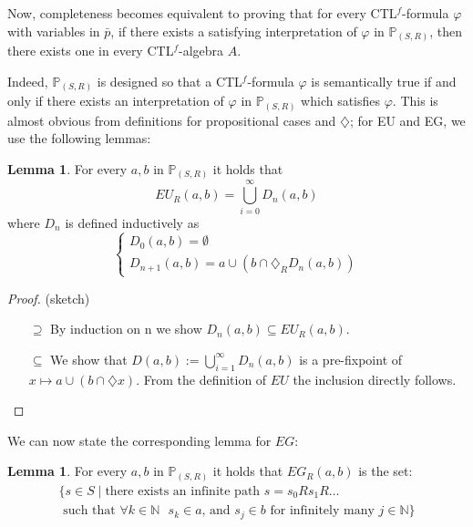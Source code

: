 \documentclass[11pt]{article}
\newcommand{\CTLf}{{CTL$^f$}}
\newcommand{\phii}{{\varphi}}
\newcommand{\dia}{{\diamondsuit}}
\theoremstyle{definition}
\newtheorem{lemma}[definition]{Lemma}
\begin{document}
Now, completeness becomes equivalent to proving that for every \CTLf-formula $\phii$ with variables in $\bar{p}$, 
if there exists a satisfying interpretation of $\phii$ in $\mathbb{P}_{(S,R)}$, then there exists one in every \CTLf-algebra $A$.

Indeed, $\mathbb{P}_{(S,R)}$ is designed so that 
a \CTLf-formula $\phii$ is semantically true if and only if there exists an interpretation of $\phii$ in $\mathbb{P}_{(S,R)}$ which satisfies $\phii$.
This is almost obvious from definitions for propositional cases and $\dia$; for EU and EG, we use the following lemmas:

\begin{lemma}\label{EU_as_union}
        For every $a,b$ in $\mathbb{P}_{(S,R)}$ it holds that \[EU_R(a,b)=\bigcup_{i=0}^{\infty}D_n(a,b)\] where $D_n$ is defined inductively as
        \begin{equation*}
            \begin{cases}
                D_0(a,b)=\emptyset\\
                D_{n+1}(a,b)=a\cup(b\cap\dia_R D_n(a,b))
            \end{cases}
        \end{equation*}
        
\end{lemma}

\begin{proof}(sketch)
    \begin{itemize}
        \item[$\supseteq$] By induction on n we show $D_n(a,b) \subseteq EU_R(a,b)$.
        \item[$\subseteq$] We show that $D(a,b) := \bigcup_{i=1}^{\infty}D_n(a,b)$ is a pre-fixpoint of $x \mapsto a \cup (b \cap \dia x)$. From the definition of $EU$ the inclusion directly follows.
    \end{itemize}
\end{proof}

We can now state the corresponding lemma for $EG$:
\begin{lemma}\label{EG_as_set}
    For every $a,b$ in $\mathbb{P}_{(S,R)}$ it holds that $EG_R(a,b)$ is the set:
\begin{multline*}
    \{s\in S\mid \mbox{there exists an infinite path } s=s_0Rs_1R\ldots\\
    \mbox{ such that }\forall k\in \mathbb{N} \mbox{ } s_k\in a\mbox{, and } s_{j}\in b \mbox{ for infinitely many } j \in\mathbb{N}\}
\end{multline*}
\end{lemma}
\end{document}
